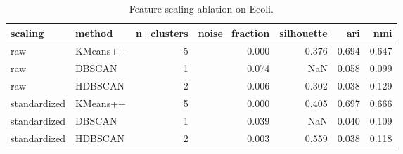 \begin{table}[t]
\caption{Feature-scaling ablation on Ecoli.}
\label{tab:scaling}
\begin{tabular}{llrrrrr}
\toprule
scaling & method & n\_clusters & noise\_fraction & silhouette & ari & nmi \\
\midrule
raw & KMeans++ & 5 & 0.000 & 0.376 & 0.694 & 0.647 \\
raw & DBSCAN & 1 & 0.074 & NaN & 0.058 & 0.099 \\
raw & HDBSCAN & 2 & 0.006 & 0.302 & 0.038 & 0.129 \\
standardized & KMeans++ & 5 & 0.000 & 0.405 & 0.697 & 0.666 \\
standardized & DBSCAN & 1 & 0.039 & NaN & 0.040 & 0.109 \\
standardized & HDBSCAN & 2 & 0.003 & 0.559 & 0.038 & 0.118 \\
\bottomrule
\end{tabular}
\end{table}
